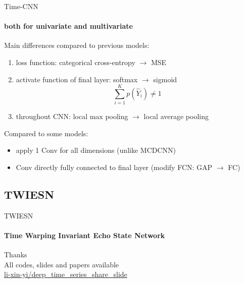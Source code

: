 \documentclass[aspectratio=169]{ctexbeamer}
\begin{document}
\begin{frame}{Time-CNN }
	\framesubtitle{both for univariate and multivariate}
	Main differences compared to previous models:
	\begin{enumerate}
		\item loss function: categorical cross-entropy $\to$ MSE
		\item activate function of final layer: softmax $\to$ sigmoid
			$$\sum_{i=1}^{K}{p(\hat Y_{i})} \ne 1$$
		\item throughout CNN: local max pooling $\to$ local average pooling
	\end{enumerate}
	Compared to some models:
	\begin{itemize}
		\item apply 1 Conv for all dimensions (unlike MCDCNN)
		\item Conv directly fully connected to final layer (modify FCN: GAP $\to$ FC)
	\end{itemize}

\end{frame}

\subsection{TWIESN}
\begin{frame}{TWIESN}
	\framesubtitle{Time Warping Invariant Echo State Network}
\end{frame}



\begin{frame}{}
  \begin{center}
  {\Huge{Thanks}} \\
  All codes, slides and papers available\\
  \faGithub \href{https://github.com/li-xin-yi/deep_time_series_share_slide}{li-xin-yi/deep\_time\_series\_share\_slide}
\end{center}
\end{frame}
\end{document}
